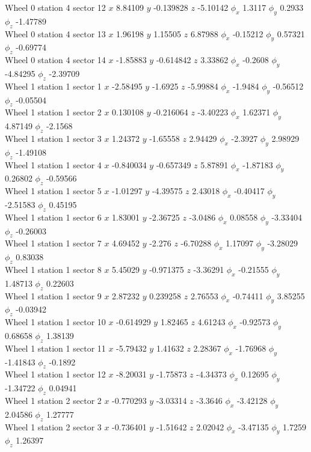 \documentclass[compress]{beamer}
\begin{document}
\begin{frame}
Wheel 0 station 4 sector 12 $x$ 8.84109 $y$ -0.139828 $z$ -5.10142 $\phi_x$ 1.3117 $\phi_y$ 0.2933 $\phi_z$ -1.47789 \\
Wheel 0 station 4 sector 13 $x$ 1.96198 $y$ 1.15505 $z$ 6.87988 $\phi_x$ -0.15212 $\phi_y$ 0.57321 $\phi_z$ -0.69774 \\
Wheel 0 station 4 sector 14 $x$ -1.85883 $y$ -0.614842 $z$ 3.33862 $\phi_x$ -0.2608 $\phi_y$ -4.84295 $\phi_z$ -2.39709 \\
Wheel 1 station 1 sector 1 $x$ -2.58495 $y$ -1.6925 $z$ -5.99884 $\phi_x$ -1.9484 $\phi_y$ -0.56512 $\phi_z$ -0.05504 \\
Wheel 1 station 1 sector 2 $x$ 0.130108 $y$ -0.216064 $z$ -3.40223 $\phi_x$ 1.62371 $\phi_y$ 4.87149 $\phi_z$ -2.1568 \\
Wheel 1 station 1 sector 3 $x$ 1.24372 $y$ -1.65558 $z$ 2.94429 $\phi_x$ -2.3927 $\phi_y$ 2.98929 $\phi_z$ -1.49108 \\
Wheel 1 station 1 sector 4 $x$ -0.840034 $y$ -0.657349 $z$ 5.87891 $\phi_x$ -1.87183 $\phi_y$ 0.26802 $\phi_z$ -0.59566 \\
Wheel 1 station 1 sector 5 $x$ -1.01297 $y$ -4.39575 $z$ 2.43018 $\phi_x$ -0.40417 $\phi_y$ -2.51583 $\phi_z$ 0.45195 \\
Wheel 1 station 1 sector 6 $x$ 1.83001 $y$ -2.36725 $z$ -3.0486 $\phi_x$ 0.08558 $\phi_y$ -3.33404 $\phi_z$ -0.26003 \\
Wheel 1 station 1 sector 7 $x$ 4.69452 $y$ -2.276 $z$ -6.70288 $\phi_x$ 1.17097 $\phi_y$ -3.28029 $\phi_z$ 0.83038 \\
Wheel 1 station 1 sector 8 $x$ 5.45029 $y$ -0.971375 $z$ -3.36291 $\phi_x$ -0.21555 $\phi_y$ 1.48713 $\phi_z$ 0.22603 \\
Wheel 1 station 1 sector 9 $x$ 2.87232 $y$ 0.239258 $z$ 2.76553 $\phi_x$ -0.74411 $\phi_y$ 3.85255 $\phi_z$ -0.03942 \\
Wheel 1 station 1 sector 10 $x$ -0.614929 $y$ 1.82465 $z$ 4.61243 $\phi_x$ -0.92573 $\phi_y$ 0.68658 $\phi_z$ 1.38139 \\
Wheel 1 station 1 sector 11 $x$ -5.79432 $y$ 1.41632 $z$ 2.28367 $\phi_x$ -1.76968 $\phi_y$ -1.41843 $\phi_z$ -0.1892 \\
Wheel 1 station 1 sector 12 $x$ -8.20031 $y$ -1.75873 $z$ -4.34373 $\phi_x$ 0.12695 $\phi_y$ -1.34722 $\phi_z$ 0.04941 \\
Wheel 1 station 2 sector 2 $x$ -0.770293 $y$ -3.03314 $z$ -3.3646 $\phi_x$ -3.42128 $\phi_y$ 2.04586 $\phi_z$ 1.27777 \\
Wheel 1 station 2 sector 3 $x$ -0.736401 $y$ -1.51642 $z$ 2.02042 $\phi_x$ -3.47135 $\phi_y$ 1.7259 $\phi_z$ 1.26397 \\

\end{frame}
\end{document}
